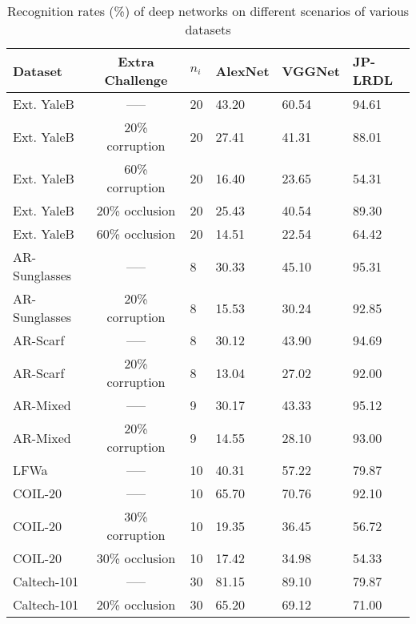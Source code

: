 \documentclass[journal]{IEEEtran}
\newcommand\Tstrut{\rule{0pt}{2.6ex}}         %
\newcommand\Bstrut{\rule[-0.9ex]{0pt}{0pt}}   %
\begin{document}
\begin{table}[t]
\caption{Recognition rates (\%) of deep networks on different scenarios of various datasets}
\label{table:Deep}
\centering
\begin{tabular}{|l|c|l|p{0.9cm}|p{0.9cm}|p{1.1cm}|}
\hline
Dataset & Extra Challenge & $n_i$ & AlexNet & VGGNet & JP-LRDL \Tstrut\Bstrut\\
\hline \hline
Ext. YaleB & -----                  & 20 & 43.20 &  60.54 & 94.61 \Tstrut\\  
Ext. YaleB & 20\% corruption        & 20 & 27.41 &  41.31 & 88.01 \Tstrut\\
Ext. YaleB & 60\% corruption        & 20 & 16.40 &  23.65 & 54.31 \Tstrut\\
Ext. YaleB & 20\% occlusion         & 20 & 25.43 &  40.54 & 89.30 \Tstrut\\
Ext. YaleB & 60\% occlusion         & 20 & 14.51 &  22.54 & 64.42 \Tstrut\Bstrut\\
\hline
AR-Sunglasses  & -----            & 8 & 30.33 &  45.10 & 95.31 \Tstrut\\
AR-Sunglasses  & 20\% corruption  & 8 & 15.53 &  30.24 & 92.85 \Tstrut\\
AR-Scarf  & -----                 & 8 & 30.12 &  43.90 & 94.69 \Tstrut\\
AR-Scarf  & 20\% corruption       & 8 & 13.04 &  27.02 & 92.00 \Tstrut\\
AR-Mixed  & -----                 & 9 & 30.17 &  43.33 & 95.12 \Tstrut\Bstrut\\
AR-Mixed  & 20\% corruption       & 9 & 14.55 &  28.10 & 93.00 \Tstrut\Bstrut\\
\hline
LFWa & -----                      & 10 & 40.31 &  57.22 & 79.87 \Tstrut\Bstrut\\  
\hline
COIL-20 & -----                         & 10 & 65.70 & 70.76 & 92.10 \Tstrut\\
COIL-20 & 30\% corruption               & 10 & 19.35 & 36.45 & 56.72 \Tstrut\\
COIL-20 & 30\% occlusion                & 10 & 17.42 & 34.98 & 54.33 \Tstrut\Bstrut\\
\hline
Caltech-101 & -----                     & 30 & 81.15 & 89.10 & 79.87 \Tstrut\\
Caltech-101 & 20\% occlusion            & 30 & 65.20 & 69.12 & 71.00 \Tstrut\Bstrut\\
\hline
\end{tabular}
\end{table}
\end{document}
